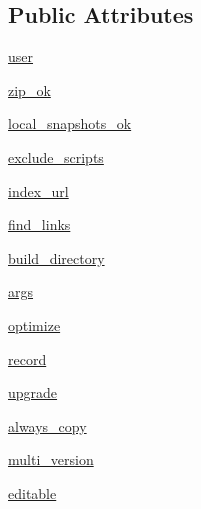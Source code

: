 \subsection*{Public Attributes}
\begin{DoxyCompactItemize}
\item 
\hyperlink{classsetuptools_1_1command_1_1easy__install_1_1easy__install_ae4bf410b8b658b1c1a709ae8947e7e2c}{user}
\item 
\hyperlink{classsetuptools_1_1command_1_1easy__install_1_1easy__install_a3cf027b47425e5bdedb5b0c6929346ba}{zip\+\_\+ok}
\item 
\hyperlink{classsetuptools_1_1command_1_1easy__install_1_1easy__install_ac990ee964a5fffad9b74da0491be48ea}{local\+\_\+snapshots\+\_\+ok}
\item 
\hyperlink{classsetuptools_1_1command_1_1easy__install_1_1easy__install_ad4f35f8a4e3aede4547ac57640dce932}{exclude\+\_\+scripts}
\item 
\hyperlink{classsetuptools_1_1command_1_1easy__install_1_1easy__install_a4f86d2376a54281ba9f8d503ba8cfcb4}{index\+\_\+url}
\item 
\hyperlink{classsetuptools_1_1command_1_1easy__install_1_1easy__install_ad44d29a7b59632e3860ec11bf8b3845d}{find\+\_\+links}
\item 
\hyperlink{classsetuptools_1_1command_1_1easy__install_1_1easy__install_addd15d5fea61ff7542f5330e1d5305c6}{build\+\_\+directory}
\item 
\hyperlink{classsetuptools_1_1command_1_1easy__install_1_1easy__install_a245326eef92af2fd2490071ec2fa271b}{args}
\item 
\hyperlink{classsetuptools_1_1command_1_1easy__install_1_1easy__install_acd3bdda216b3dad1afe4f777866190fc}{optimize}
\item 
\hyperlink{classsetuptools_1_1command_1_1easy__install_1_1easy__install_a5fed7200760a507706498813f350a424}{record}
\item 
\hyperlink{classsetuptools_1_1command_1_1easy__install_1_1easy__install_a320116ea1771a34a2097eb2922d78a0e}{upgrade}
\item 
\hyperlink{classsetuptools_1_1command_1_1easy__install_1_1easy__install_a81a4e66536cc8daacb77994c1dfee99d}{always\+\_\+copy}
\item 
\hyperlink{classsetuptools_1_1command_1_1easy__install_1_1easy__install_a1bf70a7cc16cbed120893c9bf246ffbb}{multi\+\_\+version}
\item 
\hyperlink{classsetuptools_1_1command_1_1easy__install_1_1easy__install_a41e6e9237912d2f506304c5f03d3e234}{editable}

\end{DoxyCompactItemize}
